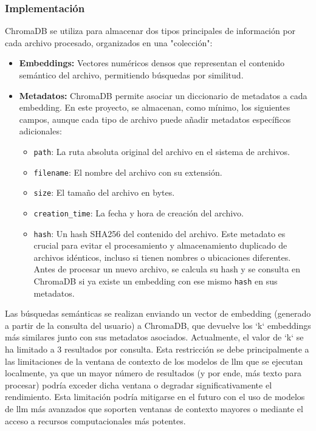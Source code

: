 \subsubsection{Implementación}
ChromaDB se utiliza para almacenar dos tipos principales de información por cada archivo procesado, organizados en una "colección":
\begin{itemize}
    \item \textbf{Embeddings:} Vectores numéricos densos que representan el contenido semántico del archivo, permitiendo búsquedas por similitud.
    \item \textbf{Metadatos:} ChromaDB permite asociar un diccionario de metadatos a cada embedding. En este proyecto, se almacenan, como mínimo, los siguientes campos, aunque cada tipo de archivo puede añadir metadatos específicos adicionales:
        \begin{itemize}
            \item \texttt{path}: La ruta absoluta original del archivo en el sistema de archivos.
            \item \texttt{filename}: El nombre del archivo con su extensión.
            \item \texttt{size}: El tamaño del archivo en bytes.
            \item \texttt{creation\_time}: La fecha y hora de creación del archivo.
            \item \texttt{hash}: Un hash SHA256 del contenido del archivo. Este metadato es crucial para evitar el procesamiento y almacenamiento duplicado de archivos idénticos, incluso si tienen nombres o ubicaciones diferentes. Antes de procesar un nuevo archivo, se calcula su hash y se consulta en ChromaDB si ya existe un embedding con ese mismo \texttt{hash} en sus metadatos.
        \end{itemize}
\end{itemize}
Las búsquedas semánticas se realizan enviando un vector de embedding (generado a partir de la consulta del usuario) a ChromaDB, que devuelve los `k` embeddings más similares junto con sus metadatos asociados. Actualmente, el valor de `k` se ha limitado a 3 resultados por consulta. Esta restricción se debe principalmente a las limitaciones de la ventana de contexto de los modelos de \gls{llm} que se ejecutan localmente, ya que un mayor número de resultados (y por ende, más texto para procesar) podría exceder dicha ventana o degradar significativamente el rendimiento. Esta limitación podría mitigarse en el futuro con el uso de modelos de \gls{llm} más avanzados que soporten ventanas de contexto mayores o mediante el acceso a recursos computacionales más potentes.

